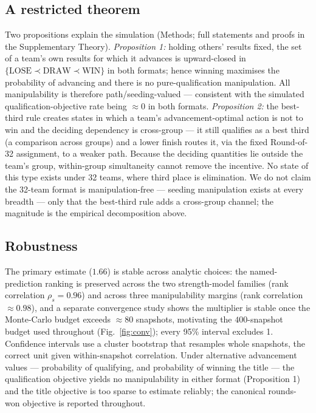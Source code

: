 \documentclass[11pt]{article}
\begin{document}
\subsection*{A restricted theorem}
Two propositions explain the simulation (Methods; full statements and proofs in the Supplementary
Theory). \emph{Proposition 1:} holding others' results fixed, the set of a team's own results for
which it advances is upward-closed in $\{\mathrm{LOSE}\prec\mathrm{DRAW}\prec\mathrm{WIN}\}$ in both
formats; hence winning maximises the probability of advancing and there is no pure-qualification
manipulation. All manipulability is therefore path/seeding-valued --- consistent with the simulated
qualification-objective rate being $\approx 0$ in both formats. \emph{Proposition 2:} the best-third
rule creates states in which a team's advancement-optimal action is not to win and the deciding
dependency is cross-group --- it still qualifies as a best third (a comparison across groups) and a
lower finish routes it, via the fixed Round-of-32 assignment, to a weaker path. Because the deciding
quantities lie outside the team's group, within-group simultaneity cannot remove the incentive. No
state of this type exists under 32 teams, where third place is elimination. We do not claim the
32-team format is manipulation-free --- seeding manipulation exists at every breadth --- only that
the best-third rule adds a cross-group channel; the magnitude is the empirical decomposition above.

\subsection*{Robustness}
The primary estimate ($1.66$) is stable across analytic choices: the named-prediction ranking is
preserved across the two strength-model families (rank correlation $\rho_s=0.96$) and across three
manipulability margins (rank correlation $\approx0.98$), and a separate convergence study shows the
multiplier is stable once the Monte-Carlo budget exceeds $\approx 80$ snapshots, motivating the
$400$-snapshot budget used throughout (Fig.~\ref{fig:conv}); every 95\% interval excludes 1.
Confidence intervals use a cluster bootstrap that resamples whole snapshots, the correct unit given
within-snapshot correlation. Under alternative advancement values --- probability
of qualifying, and probability of winning the title --- the qualification objective yields no
manipulability in either format (Proposition 1) and the title objective is too sparse to estimate
reliably; the canonical rounds-won objective is reported throughout.
\end{document}

